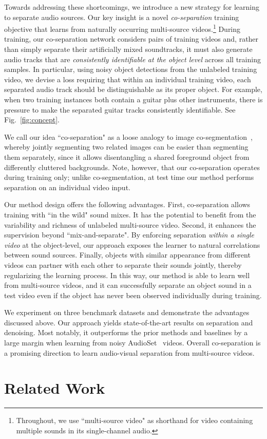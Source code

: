 \documentclass[10pt,twocolumn,letterpaper]{article}
\begin{document}
Towards addressing these shortcomings, we introduce a new strategy for learning to separate audio sources.  Our key insight is a novel \emph{co-separation} training objective that learns from naturally occurring multi-source videos.\footnote{Throughout, we use ``multi-source video" as shorthand for video containing multiple sounds in its single-channel audio.}
During training, our co-separation network considers pairs of training videos and, rather than simply separate their artificially mixed soundtracks, it must also generate audio tracks that are \emph{consistently identifiable at the object level} across all training samples. In particular, using noisy object detections from the unlabeled training video, we devise a loss requiring that within an individual training video, each separated audio track should be distinguishable as its proper object. For example, when two training instances both contain a guitar plus other instruments, there is pressure to make the separated guitar tracks consistently identifiable.
See Fig.~\ref{fig:concept}.

We call our idea ``co-separation" as a loose analogy to image co-segmentation~\cite{rother2006cosegmentation}, whereby jointly segmenting two related images can be easier than segmenting them separately, since it allows disentangling a shared foreground object from differently cluttered backgrounds.  Note, however, that our co-separation operates during training only; unlike co-segmentation, at test time our method performs separation on an individual video input.

Our method design offers the following advantages. First, co-separation allows training with ``in the wild" sound mixes. It has the potential to benefit from the variability and richness of unlabeled multi-source video. Second, it enhances the supervision beyond ``mix-and-separate". By enforcing separation \emph{within a single video} at the object-level, our approach exposes the learner to natural correlations between sound sources. Finally, objects with similar appearance from different videos can partner with each other to separate their sounds jointly, thereby regularizing the learning process. In this way, our method is able to learn well from multi-source videos, and it can successfully separate an object sound in a test video even if the object has never been observed individually during training.

We experiment on three benchmark datasets and demonstrate the advantages discussed above. Our approach yields state-of-the-art results on separation and denoising. Most notably, it outperforms the prior methods and  baselines by a large margin when learning from noisy AudioSet~\cite{gemmeke2017audio} videos. Overall co-separation is a promising direction to learn audio-visual separation from multi-source videos. \section{Related Work}
\vspace{-0.05in}
\end{document}
